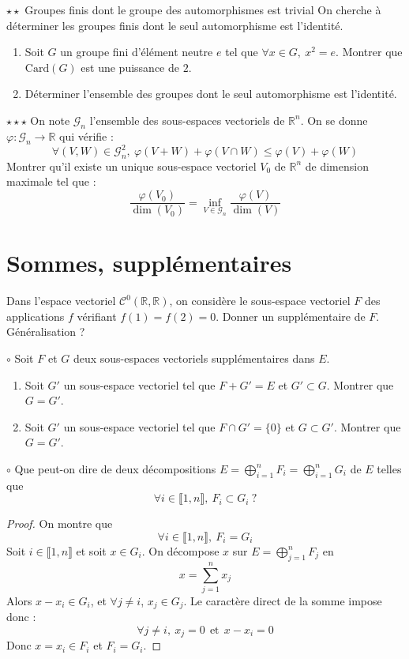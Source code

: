 \documentclass[french,a4paper]{article}
\newcommand{\R}{\mathbb{R}}
\newcommand{\card}{\text{Card}}
\theoremstyle{plain}
\theoremstyle{definition}
\theoremstyle{remark}
\begin{document}
\begin{ex}[Ulm]{$\star\star$ Groupes finis dont le groupe des automorphismes est trivial}
	On cherche à déterminer les groupes finis dont le seul automorphisme est l'identité.
	\begin{enumerate}
		\item Soit $G$ un groupe fini d'élément neutre $e$ tel que $\forall x\in G,\ x^2=e$. Montrer que $\card(G)$ est une puissance de $2$.
		\item Déterminer l'ensemble des groupes dont le seul automorphisme est l'identité.
	\end{enumerate}
\end{ex}

\begin{ex}[Ulm]{$\star\star\star$}
	On note $\mathcal{G}_n$ l'ensemble des sous-espaces vectoriels de $\R^n$. On se donne $\varphi:\mathcal{G}_n\to\R$ qui vérifie : $$\forall (V,W)\in\mathcal{G}_n^2,\ \varphi(V+W)+\varphi(V\cap W)\leqslant\varphi(V)+\varphi(W)$$ Montrer qu'il existe un unique sous-espace vectoriel $V_0$ de $\R^n$ de dimension maximale tel que : $$\frac{\varphi(V_0)}{\dim(V_0)}=\underset{V\in\mathcal{G}_n}{\inf}\frac{\varphi(V)}{\dim(V)}$$
\end{ex}

\section{Sommes, supplémentaires}

\begin{ex}[Moulin.26]{}
	Dans l'espace vectoriel $\mathcal{C}^0(\R,\R)$, on considère le sous-espace vectoriel $F$ des applications $f$ vérifiant $f(1)=f(2)=0$. Donner un supplémentaire de $F$. Généralisation ?
\end{ex}

\begin{ex}[Moulin.27]{$\circ$}
	Soit $F$ et $G$ deux sous-espaces vectoriels supplémentaires dans $E$.
	\begin{enumerate}
		\item Soit $G'$ un sous-espace vectoriel tel que $F+G'=E$ et $G'\subset G$. Montrer que $G=G'$.
		\item Soit $G'$ un sous-espace vectoriel tel que $F\cap G'=\{0\}$ et $G\subset G'$. Montrer que $G=G'$.
	\end{enumerate}
\end{ex}

\begin{ex}[Moulin.28]{$\circ$}
	Que peut-on dire de deux décompositions $E=\displaystyle\bigoplus_{i=1}^nF_i=\bigoplus_{i=1}^n G_i$ de $E$ telles que $$\forall i\in\llbracket1,n\rrbracket,\ F_i\subset G_i\ ?$$
\end{ex}
\begin{proof}
	On montre que $$\forall i\in\llbracket1,n\rrbracket,\ F_i=G_i$$ Soit $i\in\llbracket1,n\rrbracket$ et soit $x\in G_i$. On décompose $x$ sur $E=\displaystyle\bigoplus_{j=1}^nF_j$ en $$x=\sum_{j=1}^{n}x_j$$ Alors $x-x_i\in G_i$, et $\forall j\ne i$, $x_j\in G_j$. Le caractère direct de la somme impose donc : $$\forall j\ne i,\ x_j=0\ \ \text{et}\ \ x-x_i=0$$ Donc $x=x_i\in F_i$ et $F_i=G_i$.
\end{proof}
\end{document}
